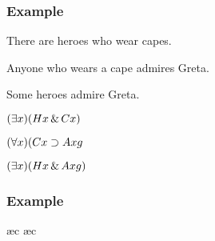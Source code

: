 \begin{frame}
\frametitle{Example}

\begin{earg}
  \item[] There are heroes who wear capes.
  \item[] Anyone who wears a cape admires Greta.
  \item[\therefore] Some heroes admire Greta.
\end{earg}
\bigskip
\begin{earg}
  \item[] $(\exists x)(Hx \,\&\, Cx)$
  \item[] $(\forall x)(Cx \supset Axg$
  \item[\therefore] $(\exists x)(Hx \,\&\, Axg)$
\end{earg}
\end{frame}

\begin{frame}
\frametitle{Example}
\small
\begin{fitchproof}
  \open
  \ae{c}
  \ae{c}
  \close
\end{fitchproof}
\end{frame}


